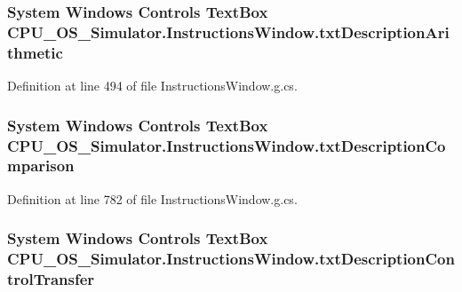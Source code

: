 \subsubsection[{txt\+Description\+Arithmetic}]{\setlength{\rightskip}{0pt plus 5cm}System Windows Controls Text\+Box C\+P\+U\+\_\+\+O\+S\+\_\+\+Simulator.\+Instructions\+Window.\+txt\+Description\+Arithmetic\hspace{0.3cm}{\ttfamily [package]}}\label{class_c_p_u___o_s___simulator_1_1_instructions_window_a31ef64d4c64f9791d6b4aad95cd4d95f}


Definition at line 494 of file Instructions\+Window.\+g.\+cs.

\hypertarget{class_c_p_u___o_s___simulator_1_1_instructions_window_a1ac2050428b5ece7f1f6791771e9cef6}{}
\subsubsection[{txt\+Description\+Comparison}]{\setlength{\rightskip}{0pt plus 5cm}System Windows Controls Text\+Box C\+P\+U\+\_\+\+O\+S\+\_\+\+Simulator.\+Instructions\+Window.\+txt\+Description\+Comparison\hspace{0.3cm}{\ttfamily [package]}}\label{class_c_p_u___o_s___simulator_1_1_instructions_window_a1ac2050428b5ece7f1f6791771e9cef6}


Definition at line 782 of file Instructions\+Window.\+g.\+cs.

\hypertarget{class_c_p_u___o_s___simulator_1_1_instructions_window_af8667a9cb444eb6aaa84349fe194b853}{}
\subsubsection[{txt\+Description\+Control\+Transfer}]{\setlength{\rightskip}{0pt plus 5cm}System Windows Controls Text\+Box C\+P\+U\+\_\+\+O\+S\+\_\+\+Simulator.\+Instructions\+Window.\+txt\+Description\+Control\+Transfer\hspace{0.3cm}{\ttfamily [package]}}\label{class_c_p_u___o_s___simulator_1_1_instructions_window_af8667a9cb444eb6aaa84349fe194b853}


